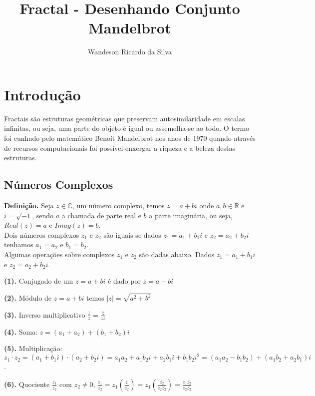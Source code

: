 \documentclass[12pt,a4paper]{article}
\title{Fractal - Desenhando Conjunto Mandelbrot}
\author{Wandeson Ricardo da Silva}
\begin{document}
\maketitle

\section{Introdução}
	Fractais são estruturas geométricas que preservam autosimilaridade em escalas infinitas, ou seja, uma parte do objeto é igual ou assemelha-se ao todo. O termo foi cunhado pelo matemático Benoít Mandelbrot nos anos de 1970 quando através de recursos computacionais foi possível enxergar a riqueza e a beleza destas estruturas.
	
\subsection{Números Complexos}

\textbf{Definição.}
	Seja $z \in \mathbb{C}$, um número complexo, temos $z = a + bi$ onde $a,b \in \mathbb{R}$ e $i = \sqrt{-1}$, sendo $a$ a chamada de parte real e $b$ a parte imaginária, ou seja, $Real(z) = a$ e $Imag(z) = b$.\\
	
	Dois números complexos $z_1$ e $z_2$ são iguais se dados $z_1 = a_1 + b_1i$ e $z_2 = a_2 + b_2i$ tenhamos $a_1=a_2$ e $b_1 = b_2$. \\
	 
	Algumas operações sobre complexos $z_1$ e $z_2$ são dadas abaixo. Dados $z_1 = a_1 + b_1i$ e $z_2 = a_2 + b_2i$.
	
	
	\textbf{(1).} Conjugado de um $z = a + bi$ é dado por $\bar{z} = a - bi$

	\textbf{(2).} Módulo de $z = a + bi$ temos $|z| = \sqrt{a^2 + b^2}$
	
	\textbf{(3).} Inverso multiplicativo $\frac{1}{z} = \frac{\bar{z}}{z\bar{z}}$
		
	\textbf{(4).} Soma: $z = (a_1 + a_2 )+ (b_1 + b_2)i$ 
	
	\textbf{(5).} Multiplicação: $ z_1 \cdot z_2 = (a_1 + b_1 i)\cdot(a_2 + b_2 i) = a_1 a_2 + a_1b_2i + a_2b_1i + b_1b_2i^2 = (a_1a_2 - b_1b_2) + (a_1b_2 + a_2b_1)i$.
	
	\textbf{(6).} Quociente $\frac{z_1}{z_2}$ com $z_2 \neq 0$, $\frac{z_1}{z_2} = z_1 \left( \frac{1}{z_2}\right) = z_1 \left( \frac{\bar{z_2}}{z_2\bar{z_2}}\right) = \frac{z_1\bar{z_2}}{z_2\bar{z_2}}$
	
	\newpage
	
\end{document}
